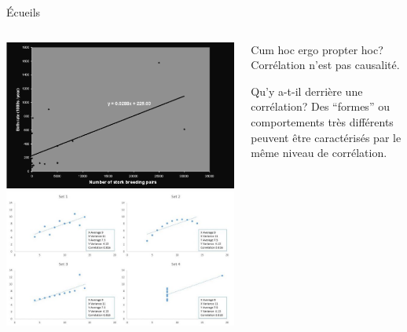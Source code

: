\documentclass[ignorenonframetext]{beamer}
\begin{document}
\begin{frame}{Écueils}

\begin{columns}
	\begin{column}{0.45\textwidth}
		\includegraphics[width=\textwidth]{img/RM-storks-paper.png}
		\includegraphics[width=\textwidth]{img/AnscombeQuarter.jpg}
	\end{column}
	\begin{column}{0.45\textwidth}
		\begin{block}{Cum hoc ergo propter hoc?}
			Corrélation n'est pas causalité.
		\end{block}
		\begin{block}{Qu'y a-t-il derrière une corrélation?}
			Des ``formes'' ou comportements très différents peuvent être caractérisés par le même niveau de corrélation.
		\end{block}
	\end{column}
\end{columns}

\end{frame}
\end{document}
